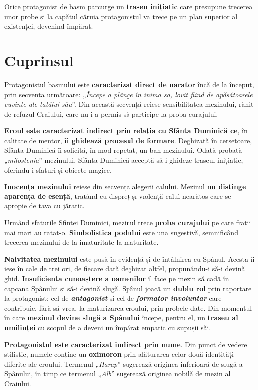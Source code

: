 \documentclass{article}
\newcommand{\qu}[1]{„\emph{#1}”}
\begin{document}
Orice protagonist de basm parcurge un \textbf{traseu inițiatic} care presupune trecerea unor probe și la capătul căruia protagonistul va trece pe un plan superior al existenței, devenind împărat.
\section{Cuprinsul}
Protagonistul basmului este \textbf{caracterizat direct de narator} încă de la început, prin secvența următoare: \qu{Începe a plânge în inima sa, lovit fiind de apăsătoarele cuvinte ale tatălui său}. Din această secvență reiese sensibilitatea mezinului, rănit de refuzul Craiului, care nu i-a permis să participe la proba curajului.

\textbf{Eroul este caracterizat indirect prin relația cu Sfânta Duminică ce}, în calitate de mentor, \textbf{îi ghidează procesul de formare}. Deghizată în cerșetoare, Sfânta Duminică îi solicită, în mod repetat, un ban mezinului. Odată probată \qu{milostenia} mezinului, Sfânta Duminică acceptă să-i ghideze traseul inițiatic, oferindu-i sfaturi și obiecte magice. 

\textbf{Inocența mezinului} reiese din secvența alegerii calului. Mezinul \textbf{nu distinge aparența de esență}, tratând cu dispreț și violență calul nearătos care se apropie de tava cu jăratic.

Urmând sfaturile Sfintei Duminici, mezinul trece \textbf{proba curajului} pe care frații mai mari au ratat-o. \textbf{Simbolistica podului} este una sugestivă, semnificând trecerea mezinului de la imaturitate la maturitate.

\textbf{Naivitatea mezinului} este pusă în evidență și de întâlnirea cu Spânul. Acesta îi iese în cale de trei ori, de fiecare dată deghizat altfel, propunându-i să-i devină ghid. \textbf{Insuficienta cunoaștere a oamenilor} îl face pe mezin să cadă în capcana Spânului și să-i devină slugă. Spânul joacă un \textbf{dublu rol} prin raportare la protagonist: cel de \textsl{\textbf{antagonist}} și cel de \textsl{\textbf{formator involuntar}} care contribuie, fără să vrea, la maturizarea eroului, prin probele date. Din momentul în care \textbf{mezinul devine slugă a Spânului} începe, pentru el, un \textbf{traseu al umilinței} cu scopul de a deveni un împărat empatic cu supușii săi.

\textbf{Protagonistul este caracterizat indirect prin nume}. Din punct de vedere stilistic, numele conține un \textbf{oximoron} prin alăturarea celor două identități diferite ale eroului. Termenul \qu{Harap} sugerează originea inferioară de slugă a Spânului, în timp ce termenul \qu{Alb} sugerează originea nobilă de mezin al Craiului.
\end{document}

